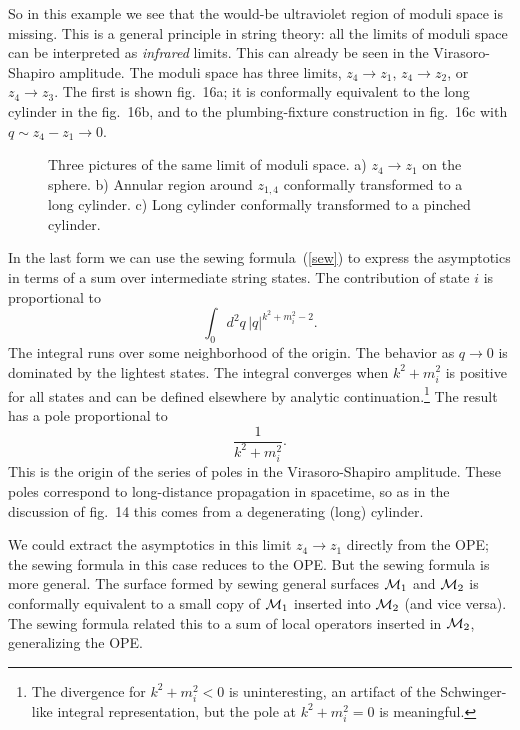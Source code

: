 So in this example we see that the would-be ultraviolet region of
moduli space is missing.  This is a general principle in string
theory: all the limits of moduli space can be interpreted as
{\it infrared} limits.  This can already be seen in the
Virasoro-Shapiro amplitude.  The moduli space has three limits,
$z_4 \to z_1$, $z_4 \to z_2$, or $z_4 \to z_3$.  The first is
shown fig.~16a; it is conformally equivalent to the long
cylinder in the fig.~16b, and to the plumbing-fixture
construction in fig.~16c with $q \sim z_4 - z_1 \to 0$.
\begin{figure}
\begin{center}
\leavevmode
{}
\end{center}
\caption[]{Three pictures of the same limit of moduli space.
a) $z_4 \to z_1$ on the sphere.
b) Annular region around $z_{1,4}$ conformally transformed to a long
cylinder.  c) Long cylinder conformally transformed to a pinched 
cylinder.}
\end{figure}
In the last
form we can use the sewing formula~(\ref{sew}) to express the
asymptotics in terms of a sum over intermediate string states. 
The contribution of state $i$ is proportional to 
\begin{equation}
\int_0 d^2q \, |q|^{k^2 + m_i^2 - 2}.
\end{equation}
The integral runs over some neighborhood of the origin.  The
behavior as $q \to 0$ is dominated by the lightest states.  The
integral converges when $k^2 + m_i^2$ is positive for all states
and can be defined elsewhere by analytic continuation.\footnote
{The divergence for $k^2 + m_i^2 < 0$ is uninteresting, an artifact
of the Schwinger-like integral representation, but the pole at $k^2 +
m_i^2 = 0$ is meaningful.} 
The result has a pole proportional to
\begin{equation}
\frac{1}{k^2 + m_i^2}. \label{pole}
\end{equation}
This is the origin of the series of poles in the Virasoro-Shapiro
amplitude.  These poles correspond to long-distance propagation in
spacetime, so as in the discussion of fig.~14 this comes from a
degenerating (long) cylinder.

We could extract the asymptotics in this limit $z_4 \to z_1$
directly from the OPE; the sewing formula in this case reduces to
the OPE.  But the sewing formula is more general.  The surface
formed by sewing general surfaces ${\cal M}_1$ and ${\cal M}_2$
is conformally equivalent to a small copy of ${\cal M}_1$
inserted into ${\cal M}_2$ (and vice versa).  The sewing formula
related this to a sum of local operators inserted in
${\cal M}_2$, generalizing the OPE.

